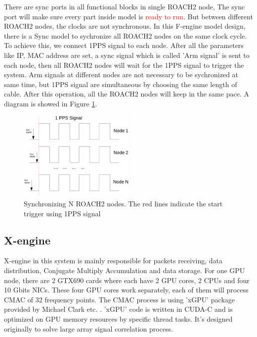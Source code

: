 \documentclass{ws-jai}
\begin{document}
        There are sync ports in all functional blocks in single ROACH2 node, The sync port will make sure every part inside model is \textcolor{red}{ready to run}. But between different ROACH2 nodes, the clocks are not synchronous. In this F-engine model design, there is a Sync model to sychronize all ROACH2 nodes on the same clock cycle. To achieve this, we connect 1PPS signal to each node. After all the parameters like IP, MAC address are set,  a sync signal which is called 'Arm signal' is sent to each node,  then all ROACH2 nodes will wait for the 1PPS signal to trigger the system. Arm signals at different nodes are not necessary to be sychronized at same time, but 1PPS signal are simultaneous by choosing the same length of cable.   After this operation, all the ROACH2 nodes will keep in the same pace. A diagram is showed in Figure \ref{fig:1pps}.
\begin{figure}[t]
 \centering
 \includegraphics[width=0.5\textwidth]{./picture/1pps_sync.eps}
\caption{Synchronizing N ROACH2 nodes. The red lines indicate the start trigger using 1PPS signal\label{fig:1pps}}
\end{figure}


\subsection{X-engine}\label{sec:X-engine}

X-engine in this system is mainly responsible for  packets receiving, data distribution,  Conjugate Multiply Accumulation and  data storage. For one GPU node, there are 2 GTX690 cards where each have 2 GPU cores, 2 CPUs and four 10 Gbits NICs. These four GPU cores work separately, each of them will process CMAC of 32 frequency points. The CMAC process is using 'xGPU' package provided by Michael Clark etc. \cite{2013IJHPC..27..178C}.  'xGPU' code is written in CUDA-C and is optimized on GPU memory resources by specific thread tasks. It's designed originally to solve large array signal correlation process.
\end{document}
